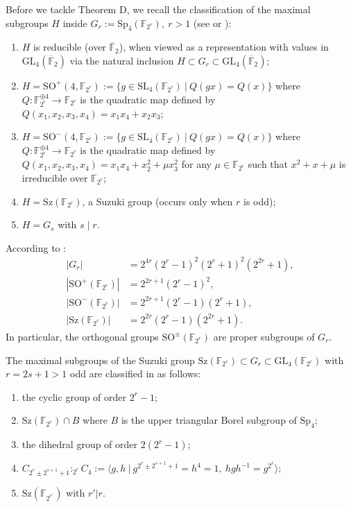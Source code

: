 \documentclass{amsart}
\theoremstyle{definition}
\newcommand{\lra}{\longrightarrow}
\newcommand{\F}{\mathbb{F}}
\newcommand{\bF}{\overline{\F}}
\newcommand{\Sp}{\mathrm{Sp}}
\newcommand{\GL}{\mathrm{GL}}
\newcommand{\SO}{\mathrm{SO}}
\newcommand{\SL}{\mathrm{SL}}
\newcommand{\Sz}{\mathrm{Sz}}
\begin{document}
Before we tackle Theorem D, we recall the classification of the maximal subgroups $H$ inside $G_r:=\Sp_4(\F_{2^r}),\ r>1$ (see \cite[p.648]{DZ} or \cite[Section 7.2]{BHRD}):
\begin{enumerate}
  \item $H$ is reducible (over $\bF_2$), when viewed as a representation with values in $\GL_4(\bF_2)$ via the natural inclusion $H\subset G_r\subset \GL_4(\bF_2)$;
  \item $H=\SO^+(4,\F_{2^r}):=\{g\in \SL_4(\F_{2^r})\ |\ Q(gx)=Q(x)\}$ where
    $Q:\F^{\oplus 4}_{2^r}\lra \F_{2^r}$ is the quadratic map defined by $Q(x_1,x_2,x_3,x_4)=x_1x_4+x_2x_3$;
  \item $H=\SO^-(4,\F_{2^r}):=\{g\in \SL_4(\F_{2^r})\ |\ Q(gx)=Q(x)\}$ where
    $Q:\F^{\oplus 4}_{2^r}\lra \F_{2^r}$ is the quadratic map defined by $Q(x_1,x_2,x_3,x_4)=x_1x_4+x_2^2+\mu x_3^2$ for any $\mu\in\F_{2^r}$ such that $x^2+x+\mu$ is irreducible over $\F_{2^r}$;
  \item $H=\Sz(\F_{2^r})$, a Suzuki group (occurs only when $r$ is odd);
  \item $H=G_s$ with $s\mid r$.
\end{enumerate}
According to \cite[p.32, Theorem 1.6.22 and p.366, Theorem 7.3.3]{BHRD}:
\begin{align*}
  |G_r|             & =2^{4r} (2^r-1)^2 (2^r+1)^2 (2^{2r}+1), \\
  |\SO^+(\F_{2^r})| & =2^{2r+1} (2^r-1)^2,                    \\
  |\SO^-(\F_{2^r})| & =2^{2r+1} (2^r-1) (2^r+1),              \\
  |\Sz(\F_{2^r})|   & =2^{2r} (2^r-1) (2^{2r}+1).
\end{align*}
In particular, the orthogonal groups $\SO^\pm(\F_{2^r})$ are proper subgroups of $G_r$.

The maximal subgroups of the Suzuki group $\Sz(\F_{2^r})\subset G_r\subset  \GL_4(\F_{2^r})$ with
$r=2s+1>1$ odd are classified in
\cite[p.385, Table 8.16]{BHRD} as follows:
\begin{enumerate}
  \item[(Sz-1)] the cyclic group of order $2^r-1$;
  \item[(Sz-2)] $\Sz(\F_{2^r})\cap B$ where $B$ is the upper triangular Borel subgroup of $\Sp_4$;
  \item[(Sz-3)] the dihedral group of order $2(2^r-1)$;
  \item[(Sz-4)] $C_{2^r\pm 2^{s+1}+1}:_{2^r} C_4:=\langle g,h\ |\ g^{2^r\pm 2^{s+1}+1}=h^4=1,\
      hgh^{-1}=g^{2^r} \rangle$;
  \item[(Sz-5)] $\Sz(\F_{2^{r'}})$ with $r'|r$.
\end{enumerate}
\end{document}
